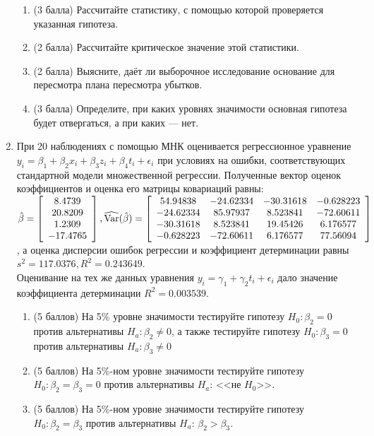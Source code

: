 \documentclass[pdftex,12pt,a4paper]{article}
\begin{document}
\begin{enumerate}
\begin{enumerate}
\item (3 балла) Рассчитайте статистику, с помощью которой проверяется указанная гипотеза.
\item (2 балла) Рассчитайте критическое значение этой статистики.
\item (2 балла) Выясните, даёт ли выборочное исследование основание для пересмотра плана пересмотра убытков.
\item (3 балла) Определите, при каких уровнях значимости основная гипотеза будет отвергаться, а при каких --- нет.
\end{enumerate}
\item При 20 наблюдениях с помощью МНК оценивается регрессионное уравнение $y_i=\beta_1+\beta_2 x_i+\beta_3 z_i+\beta_4 t_i+\epsilon_i$ при условиях на ошибки, соответствующих стандартной модели множественной регрессии. Полученные вектор оценок коэффициентов и оценка его матрицы ковариаций равны:\\
$\hat{\beta}=\left[ \begin{array}{c}
8.4739\\
20.8209\\
1.2309\\
-17.4765
\end{array}\right],
\widehat{\operatorname{Var}}(\hat{\beta})=\left[\begin{array}{cccc}
54.94838 & -24.62334 & -30.31618 & -0.628223\\
-24.62334 & 85.97937 & 8.523841 & -72.60611\\
-30.31618 & 8.523841 & 19.45426 & 6.176577\\
-0.628223 & -72.60611 & 6.176577 & 77.56094
\end{array}\right]$\\, а оценка дисперсии ошибок регрессии и коэффициент детерминации равны $s^2=117.0376, R^2=0.243649$.\\ 
Оценивание на тех же данных уравнения $y_i=\gamma_1+\gamma_2 t_i+\epsilon_i$ дало значение коэффициента детерминации $R^2=0.003539$.
\begin{enumerate}
\item (5 баллов) На 5\% уровне значимости тестируйте гипотезу $H_0:\beta_2=0$ против альтернативы $H_a: \beta_2 \ne 0$, а также тестируйте гипотезу $H_0:\beta_3=0$ против альтернативы $H_a: \beta_3 \ne 0$
\item (5 баллов) На 5\%-ном уровне значимости тестируйте гипотезу $H_0:\beta_2=\beta_3=0$ против альтернативы $H_a$: <<не $H_0$>>.
\item (5 баллов) На 5\%-ном уровне значимости тестируйте гипотезу $H_0:\beta_2=\beta_3$ против альтернативы $H_a$: $\beta_2>\beta_3$.
\end{enumerate}

\end{enumerate}
\end{document}

